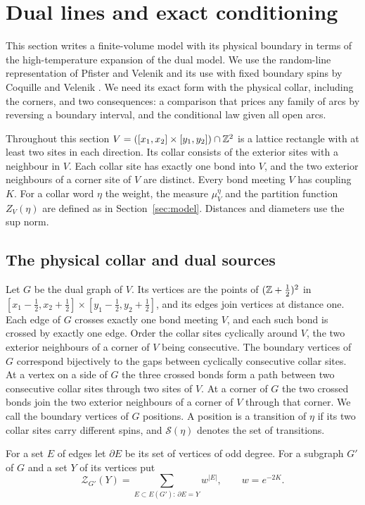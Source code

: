 \section{Dual lines and exact conditioning}\label{sec:dual}
This section writes a finite-volume model with its physical boundary in terms of the high-temperature expansion of the dual model. We use the random-line representation of Pfister and Velenik \cite[Section~6]{PV99} and its use with fixed boundary spins by Coquille and Velenik \cite[Appendix~A.2]{CV}. We need its exact form with the physical collar, including the corners, and two consequences: a comparison that prices any family of arcs by reversing a boundary interval, and the conditional law given all open arcs.

Throughout this section $V=([x_1,x_2]\times[y_1,y_2])\cap\mathbb Z^2$ is a lattice rectangle with at least two sites in each direction. Its collar consists of the exterior sites with a neighbour in $V$. Each collar site has exactly one bond into $V$, and the two exterior neighbours of a corner site of $V$ are distinct. Every bond meeting $V$ has coupling $K$. For a collar word $\eta$ the weight, the measure $\mu_V^\eta$ and the partition function $Z_V(\eta)$ are defined as in Section~\ref{sec:model}. Distances and diameters use the sup norm.

\subsection{The physical collar and dual sources}
Let $G$ be the dual graph of $V$. Its vertices are the points of $(\mathbb Z+\tfrac12)^2$ in $[x_1-\tfrac12,x_2+\tfrac12]\times[y_1-\tfrac12,y_2+\tfrac12]$, and its edges join vertices at distance one. Each edge of $G$ crosses exactly one bond meeting $V$, and each such bond is crossed by exactly one edge. Order the collar sites cyclically around $V$, the two exterior neighbours of a corner of $V$ being consecutive. The boundary vertices of $G$ correspond bijectively to the gaps between cyclically consecutive collar sites. At a vertex on a side of $G$ the three crossed bonds form a path between two consecutive collar sites through two sites of $V$. At a corner of $G$ the two crossed bonds join the two exterior neighbours of a corner of $V$ through that corner. We call the boundary vertices of $G$ positions. A position is a transition of $\eta$ if its two collar sites carry different spins, and $\mathcal S(\eta)$ denotes the set of transitions.

For a set $E$ of edges let $\partial E$ be its set of vertices of odd degree. For a subgraph $G'$ of $G$ and a set $Y$ of its vertices put
\[
 \mathcal Z_{G'}(Y)=\sum_{E\subset E(G'):\,\partial E=Y}w^{|E|},\qquad w=e^{-2K}.
\]

